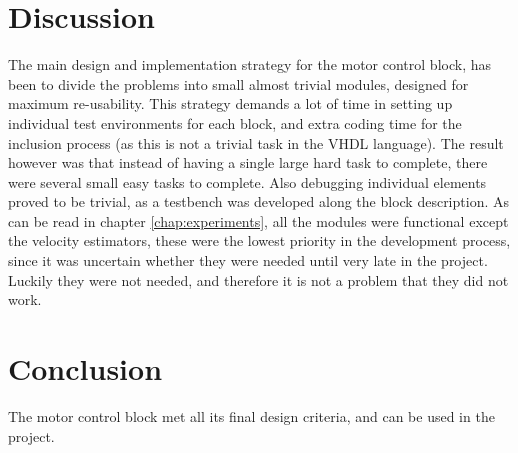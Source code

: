 \section{Discussion}
The main design and implementation strategy for the motor control block, has been to divide the problems into small almost trivial modules, designed for maximum re-usability. This strategy demands a lot of time in setting up individual test environments for each block, and extra coding time for the inclusion process (as this is not a trivial task in the VHDL language). The result however was that instead of having a single large hard task to complete, there were several small easy tasks to complete. Also debugging individual elements proved to be trivial, as a testbench was developed along the block description.
As can be read in chapter \ref{chap:experiments}, all the modules were functional except the velocity estimators, these were the lowest priority in the development process, since it was uncertain whether they were needed until very late in the project. Luckily they were not needed, and therefore it is not a problem that they did not work.

\section{Conclusion}
The motor control block met all its final design criteria, and can be used in the project.





















